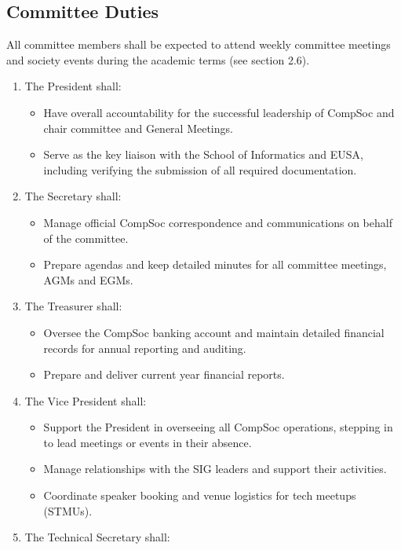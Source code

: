 \subsection{Committee Duties}
All committee members shall be expected to attend weekly committee meetings and society events during the academic terms (see section 2.6).
\begin{enumerate}
    \item The President shall:
    \begin{itemize}
        \item Have overall accountability for the successful leadership of CompSoc and chair committee and General Meetings.  
        \item Serve as the key liaison with the School of Informatics and EUSA, including verifying the submission of all required documentation.
    \end{itemize}
    \item The Secretary shall:
    \begin{itemize}
        \item Manage official CompSoc correspondence and communications on behalf of the committee.
        \item Prepare agendas and keep detailed minutes for all committee meetings, AGMs and EGMs.  
    \end{itemize}
    \item The Treasurer shall:
    \begin{itemize}
        \item Oversee the CompSoc banking account and maintain detailed financial records for annual reporting and auditing.
        \item Prepare and deliver current year financial reports.
    \end{itemize}
    \item The Vice President shall:
    \begin{itemize}
        \item Support the President in overseeing all CompSoc operations, stepping in to lead meetings or events in their absence.  
        \item Manage relationships with the SIG leaders and support their activities.
        \item Coordinate speaker booking and venue logistics for tech meetups (STMUs).
    \end{itemize}
    \item The Technical Secretary shall:
    \begin{itemize}

\end{itemize}
\end{enumerate}
